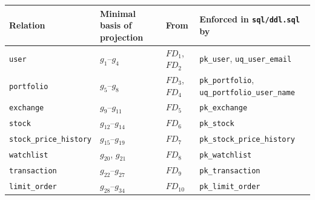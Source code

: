 \documentclass{article}
\newcommand{\gr}[2]{g_{#1}\text{--}g_{#2}}
\begin{document}
\begin{center}
\begin{tabular}{l l l l}
  \toprule
  \textbf{Relation} & \textbf{Minimal basis of projection} & \textbf{From} & \textbf{Enforced in \texttt{sql/ddl.sql} by} \\
  \midrule
  \texttt{user} & $\gr{1}{4}$ & $FD_1$, $FD_2$ & \texttt{pk\_user}, \texttt{uq\_user\_email} \\
  \texttt{portfolio} & $\gr{5}{8}$ & $FD_3$, $FD_4$ & \texttt{pk\_portfolio}, \texttt{uq\_portfolio\_user\_name} \\
  \texttt{exchange} & $\gr{9}{11}$ & $FD_5$ & \texttt{pk\_exchange} \\
  \texttt{stock} & $\gr{12}{14}$ & $FD_6$ & \texttt{pk\_stock} \\
  \texttt{stock\_price\_history} & $\gr{15}{19}$ & $FD_7$ & \texttt{pk\_stock\_price\_history} \\
  \texttt{watchlist} & $g_{20}$, $g_{21}$ & $FD_8$ & \texttt{pk\_watchlist} \\
  \texttt{transaction} & $\gr{22}{27}$ & $FD_9$ & \texttt{pk\_transaction} \\
  \texttt{limit\_order} & $\gr{28}{34}$ & $FD_{10}$ & \texttt{pk\_limit\_order} \\
  \bottomrule
\end{tabular}
\end{center}
\end{document}
